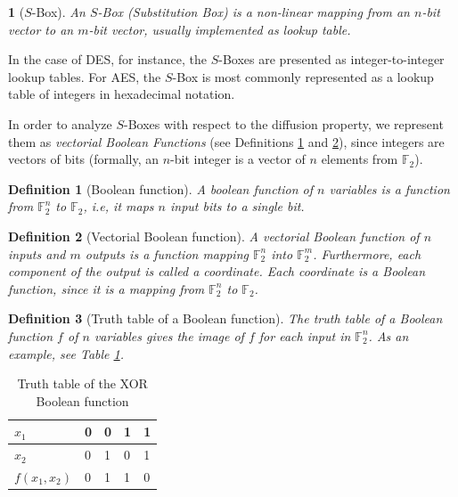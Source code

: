 \documentclass{report}
\newtheorem{definition}{Definition}{\bfseries}{\itshape}
\newtheorem*{concept}{}{\bfseries}{\itshape}
\begin{document}
\begin{concept}[$S$-Box]
An $S$-Box (Substitution Box) is a non-linear mapping from an $n$-bit vector to an $m$-bit vector, usually implemented as lookup table.
\end{concept}

In the case of DES, for instance, the $S$-Boxes are presented as integer-to-integer lookup tables. For AES, the $S$-Box is most commonly represented as a lookup table of integers in hexadecimal notation. 

In order to analyze $S$-Boxes with respect to the diffusion property, we represent them as \emph{vectorial Boolean Functions} (see Definitions \ref{def:boolean-function} and \ref{def:vectorial-boolean-function}), since integers are vectors of bits (formally, an $n$-bit integer is a vector of $n$ elements from $\mathbb{F}_2$).

\begin{definition}[Boolean function]\label{def:boolean-function}
A boolean function of $n$ variables is a function from $\mathbb{F}^n_2$ to $\mathbb{F}_2$, i.e, it maps $n$ input bits to a single bit.
\end{definition}

\begin{definition}[Vectorial Boolean function]\label{def:vectorial-boolean-function}
A vectorial Boolean function of $n$ inputs and $m$ outputs is a function mapping $\mathbb{F}^n_2$ into $\mathbb{F}^m_2$. Furthermore, each component of the output is called a \emph{coordinate}. Each coordinate is a Boolean function, since it is a mapping from $\mathbb{F}^n_2$ to $\mathbb{F}_2$.
\end{definition}

\begin{definition}[Truth table of a Boolean function]\label{def:truth-table}
The truth table of a Boolean function $f$ of $n$ variables gives the image of $f$ for each input in $\mathbb{F}^n_2$. As an example, see Table \ref{tab:truth-table}.
\end{definition}

\begin{table}[h!]
\centering
\begin{tabular}{|l|l|l|l|l|}
\hline
$x_1$         & 0 & 0 & 1 & 1 \\ \hline
$x_2$         & 0 & 1 & 0 & 1 \\ \hline
$f(x_1, x_2)$ & 0 & 1 & 1 & 0 \\ \hline
\end{tabular}
\caption{Truth table of the XOR Boolean function}
\label{tab:truth-table}
\end{table}
\end{document}
